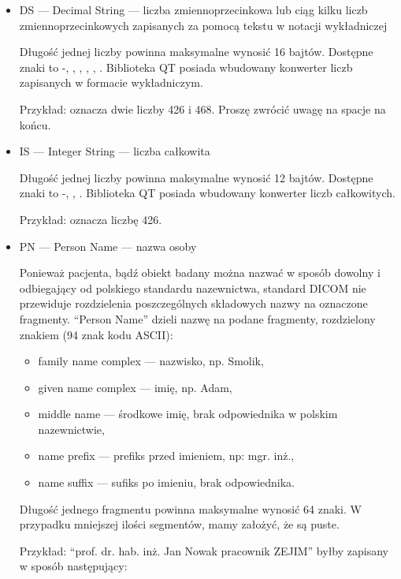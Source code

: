 \begin{itemize}
    \item DS --- Decimal String --- liczba zmiennoprzecinkowa lub ciąg kilku liczb zmiennoprzecinkowych zapisanych za pomocą tekstu w notacji wykładniczej

          Długość jednej liczby powinna maksymalne wynosić 16 bajtów.
          Dostępne znaki to -, \dataword{+}, \dataword{-}, , , .
          Biblioteka QT posiada wbudowany konwerter liczb zapisanych w formacie wykładniczym.

          Przykład:  oznacza dwie liczby 426 i 468. Proszę zwrócić uwagę na spacje na końcu.

    \item IS --- Integer String --- liczba całkowita

          Długość jednej liczby powinna maksymalne wynosić 12 bajtów.
          Dostępne znaki to -, \dataword{+}, \dataword{-}.
          Biblioteka QT posiada wbudowany konwerter liczb całkowitych.

          Przykład:   oznacza liczbę 426.

    \item PN --- Person Name --- nazwa osoby

          Ponieważ pacjenta, bądź obiekt badany można nazwać w sposób dowolny i odbiegający od polskiego standardu nazewnictwa, standard DICOM nie przewiduje rozdzielenia poszczególnych składowych nazwy na oznaczone fragmenty.
          \enquote{Person Name} dzieli nazwę na podane fragmenty, rozdzielony znakiem \dataword{\^{}} (94 znak kodu ASCII):
          \begin{itemize}
              \item family name complex --- nazwisko, np. Smolik,
              \item given name complex --- imię, np. Adam,
              \item middle name --- środkowe imię, brak odpowiednika w polskim nazewnictwie,
              \item name prefix --- prefiks przed imieniem, np: mgr. inż.,
              \item name suffix --- sufiks po imieniu, brak odpowiednika.
          \end{itemize}
          Długość jednego fragmentu powinna maksymalne wynosić 64 znaki.
          W przypadku mniejszej ilości segmentów, mamy założyć, że są puste.

          Przykład: \enquote{prof. dr. hab. inż. Jan Nowak pracownik ZEJIM} byłby zapisany w sposób następujący: 


\end{itemize}
